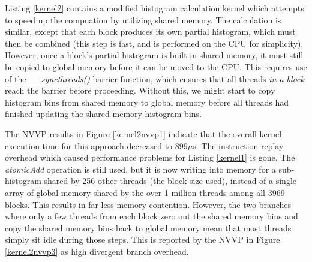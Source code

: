 \documentclass{article}
\begin{document}
Listing \ref{kernel2} contains a modified histogram calculation kernel which attempts to speed up the compuation by utilizing shared memory. The calculation is similar, except that each block produces its own partial histogram, which must then be combined (this step is fast, and is performed on the CPU for simplicity). However, once a block's partial histogram is built in shared memory, it must still be copied to global memory before it can be moved to the CPU. This requires use of the \emph{\_\_syncthreads()} barrier function, which ensures that all threads \emph{in a block} reach the barrier before proceeding. Without this, we might start to copy histogram bins from shared memory to global memory before all threads had finished updating the shared memory histogram bins.

The NVVP results in Figure \ref{kernel2nvvp1} indicate that the overall kernel execution time for this approach decreased to 899$\mu$s. The instruction replay overhead which caused performance problems for Listing \ref{kernel1} is gone. The \emph{atomicAdd} operation is still used, but it is now writing into memory for a sub-histogram shared by 256 other threads (the block size used), instead of a single array of global memory shared by the over 1 million threads among all 3969 blocks. This results in far less memory contention. However, the two branches where only a few threads from each block zero out the shared memory bins and copy the shared memory bins back to global memory mean that most threads simply sit idle during those steps. This is reported by the NVVP in Figure \ref{kernel2nvvp3} as high divergent branch overhead.
\end{document}
